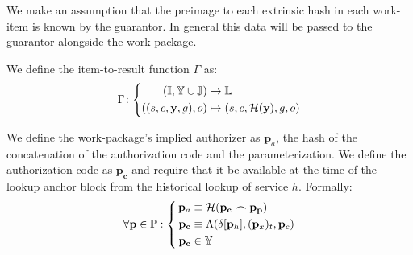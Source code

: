 We make an assumption that the preimage to each extrinsic hash in each work-item is known by the guarantor. In general this data will be passed to the guarantor alongside the work-package.
%
%

We define the item-to-result function $\Gamma$ as:
\begin{equation}
  \Gamma\colon\left\{\begin{aligned}
    (\mathbb{I}, \Y \cup \mathbb{J}) &\to \mathbb{L}\\
    ((s, c, \mathbf{y}, g), o) &\mapsto (s, c, \mathcal{H}(\mathbf{y}), g, o)
  \end{aligned}\right.
\end{equation}

We define the work-package's implied authorizer as $\mathbf{p}_a$, the hash of the concatenation of the authorization code and the parameterization. We define the authorization code as $\mathbf{p}_\mathbf{c}$ and require that it be available at the time of the lookup anchor block from the historical lookup of service $h$. Formally:
\begin{equation}
  \forall \mathbf{p} \in \mathbb{P}: \left\{\,\begin{aligned}
    \mathbf{p}_a &\equiv \mathcal{H}(\mathbf{p}_\mathbf{c} \concat \mathbf{p}_\mathbf{p}) \\
    \mathbf{p}_\mathbf{c} &\equiv \Lambda(\delta[\mathbf{p}_h], (\mathbf{p}_x)_t, \mathbf{p}_c) \\
    \mathbf{p}_\mathbf{c} &\in \Y
  \end{aligned}\right.
\end{equation}

